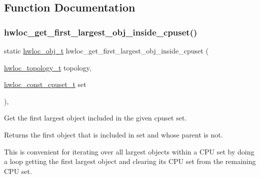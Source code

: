 \subsection{Function Documentation}
\mbox{\label{a00195_ga547325a4193dbc215d07c23097519d79}} 
\subsubsection{\texorpdfstring{hwloc\+\_\+get\+\_\+first\+\_\+largest\+\_\+obj\+\_\+inside\+\_\+cpuset()}{hwloc\_get\_first\_largest\_obj\_inside\_cpuset()}}
{\footnotesize\ttfamily static \hyperlink{a00185_ga79b8ab56877ef99ac59b833203391c7d}{hwloc\+\_\+obj\+\_\+t} hwloc\+\_\+get\+\_\+first\+\_\+largest\+\_\+obj\+\_\+inside\+\_\+cpuset (\begin{DoxyParamCaption}\item[{\hyperlink{a00186_ga9d1e76ee15a7dee158b786c30b6a6e38}{hwloc\+\_\+topology\+\_\+t}}]{topology,  }\item[{\hyperlink{a00183_ga1f784433e9b606261f62d1134f6a3b25}{hwloc\+\_\+const\+\_\+cpuset\+\_\+t}}]{set }\end{DoxyParamCaption})\hspace{0.3cm}{\ttfamily [inline]}, {\ttfamily [static]}}



Get the first largest object included in the given cpuset {\ttfamily set}. 

\begin{DoxyReturn}{Returns}
the first object that is included in {\ttfamily set} and whose parent is not.
\end{DoxyReturn}
This is convenient for iterating over all largest objects within a C\+PU set by doing a loop getting the first largest object and clearing its C\+PU set from the remaining C\+PU set. \mbox{\label{a00195_ga34ca563fa3a6a4e05268f36a87668511}} 
